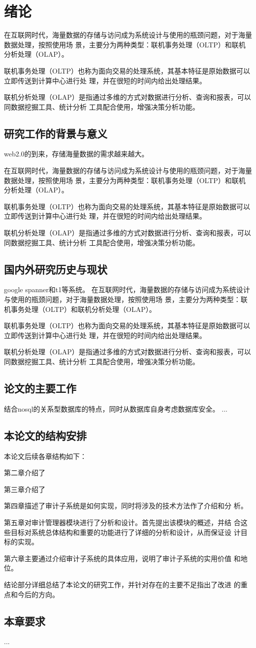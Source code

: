 
\chapter{绪论}
在互联网时代，海量数据的存储与访问成为系统设计与使用的瓶颈问题，对于海量数据处理，按照使用场
景，主要分为两种类型：联机事务处理（OLTP）和联机分析处理（OLAP）。

联机事务处理（OLTP）也称为面向交易的处理系统，其基本特征是原始数据可以立即传送到计算中心进行处
理，并在很短的时间内给出处理结果。

联机分析处理（OLAP）是指通过多维的方式对数据进行分析、查询和报表，可以同数据挖掘工具、统计分析
工具配合使用，增强决策分析功能。
\section{研究工作的背景与意义}
web2.0的到来，存储海量数据的需求越来越大。

在互联网时代，海量数据的存储与访问成为系统设计与使用的瓶颈问题，对于海量数据处理，按照使用场
景，主要分为两种类型：联机事务处理（OLTP）和联机分析处理（OLAP）。

联机事务处理（OLTP）也称为面向交易的处理系统，其基本特征是原始数据可以立即传送到计算中心进行处
理，并在很短的时间内给出处理结果。

联机分析处理（OLAP）是指通过多维的方式对数据进行分析、查询和报表，可以同数据挖掘工具、统计分析
工具配合使用，增强决策分析功能。
\section{国内外研究历史与现状}
google spanner和t1等系统。
在互联网时代，海量数据的存储与访问成为系统设计与使用的瓶颈问题，对于海量数据处理，按照使用场
景，主要分为两种类型：联机事务处理（OLTP）和联机分析处理（OLAP）。

联机事务处理（OLTP）也称为面向交易的处理系统，其基本特征是原始数据可以立即传送到计算中心进行处
理，并在很短的时间内给出处理结果。

联机分析处理（OLAP）是指通过多维的方式对数据进行分析、查询和报表，可以同数据挖掘工具、统计分析
工具配合使用，增强决策分析功能。
\section{论文的主要工作}

结合nosql的关系型数据库的特点，同时从数据库自身考虑数据库安全。
...
\section{本论文的结构安排}
本论文后续各章结构如下：

第二章介绍了

第三章介绍了

第四章描述了审计子系统是如何实现，同时将涉及的技术方法作了介绍和分
析。

第五章对审计管理器模块进行了分析和设计。首先提出该模块的概述，并结
合这些目标对系统总体结构和重要的功能进行了详细的分析和设计，从而保证设
计目标的实现。

第六章主要通过介绍审计子系统的具体应用，说明了审计子系统的实用价值
和地位。

结论部分详细总结了本论文的研究工作，并针对存在的主要不足指出了改进
的重点和今后的方向。
\section{本章要求}
...